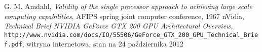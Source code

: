 \begin{thebibliography}{999}

 G. M. Amdahl, \emph{Validity of the single processor approach to achieving large scale computing capabilities}, AFIPS spring joint computer conference, 1967
 nVidia, \emph{Technical Brief NVIDIA GeForce GTX 200 GPU Architectural Overview}, \texttt{http://www.nvidia.com/docs/IO/55506/GeForce\_GTX\_200\_GPU\_Technical\_Brief.pdf}, witryna internetowa, stan na 24 października 2012

\end{thebibliography}
